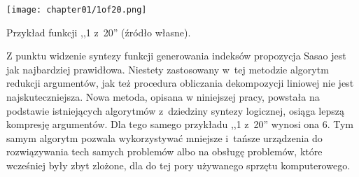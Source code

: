 \begin{table}
\centering
\texttt{[image: chapter01/1of20.png]}
\caption{Przykład funkcji ,,1 z~20'' (źródło własne).}
\label{fig:1of20}
\end{table}

Z punktu widzenie syntezy funkcji generowania indeksów propozycja Sasao jest jak najbardziej prawidłowa.
Niestety zastosowany w~tej metodzie algorytm redukcji argumentów,
jak też procedura obliczania dekompozycji liniowej nie jest najskuteczniejsza.
Nowa metoda,
opisana w niniejszej pracy,
powstała na podstawie istniejących algorytmów z~dziedziny syntezy logicznej,
osiąga lepszą kompresję argumentów.
Dla tego samego przykładu ,,1 z~20'' wynosi ona 6.
Tym samym algorytm pozwala wykorzystywać mniejsze i~tańsze urządzenia do rozwiązywania tech samych problemów
albo na obsługę problemów, które wcześniej były zbyt zlożone,
dla do tej pory używanego sprzętu komputerowego.







